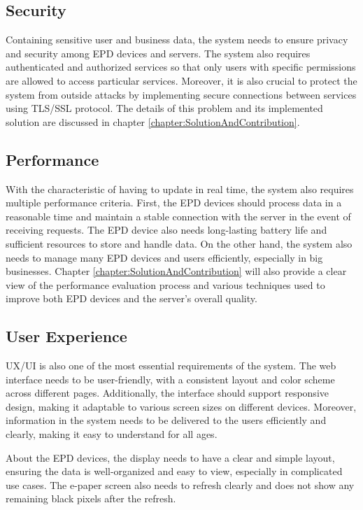 \documentclass[../Main.tex]{subfiles}
\begin{document}
\subsection{Security}
Containing sensitive user and business data, the system needs to ensure privacy and security among EPD devices and servers. The system also requires authenticated and authorized services so that only users with specific permissions are allowed to access particular services. Moreover, it is also crucial to protect the system from outside attacks by implementing secure connections between services using TLS/SSL protocol. The details of this problem and its implemented solution are discussed in chapter \ref{chapter:SolutionAndContribution}.

\subsection{Performance}
With the characteristic of having to update in real time, the system also requires multiple performance criteria. First, the EPD devices should process data in a reasonable time and maintain a stable connection with the server in the event of receiving requests. The EPD device also needs long-lasting battery life and sufficient resources to store and handle data.  On the other hand, the system also needs to manage many EPD devices and users efficiently, especially in big businesses. Chapter \ref{chapter:SolutionAndContribution} will also provide a clear view of the performance evaluation process and various techniques used to improve both EPD devices and the server's overall quality.

\subsection{User Experience}
UX/UI is also one of the most essential requirements of the system. The web interface needs to be user-friendly, with a consistent layout and color scheme across different pages. Additionally, the interface should support responsive design, making it adaptable to various screen sizes on different devices. Moreover, information in the system needs to be delivered to the users efficiently and clearly, making it easy to understand for all ages.

About the EPD devices, the display needs to have a clear and simple layout, ensuring the data is well-organized and easy to view, especially in complicated use cases. The e-paper screen also needs to refresh clearly and does not show any remaining black pixels after the refresh.
\end{document}
